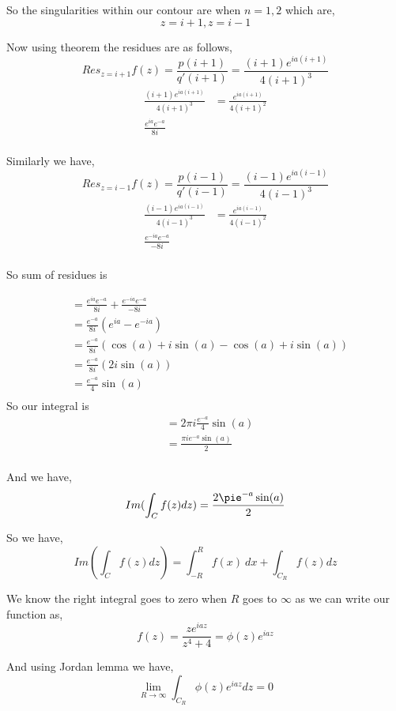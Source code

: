 \documentclass[a4paper]{report}
\begin{document}
So the singularities within our contour are when $n = 1, 2$ which are, 
$$ z = i + 1, z = i - 1 $$  



Now using theorem the residues are as follows, 
$$ Res_{z = i + 1} f(z) = \frac{p(i + 1)}{q'(i + 1)}  = \frac{(i + 1)e^{ia(i + 1)}}{4(i + 1)^{3}}$$ 
\begin{align*}
    \frac{(i + 1)e^{ia(i + 1)}}{4(i + 1)^{3}} &=\frac{ e^{ia(i + 1)}}{4(i + 1)^2}\\
\frac{ e^{ia }e^{- a}}{8i}\\
\end{align*}

Similarly we have, 
$$ Res_{z = i - 1} f(z) = \frac{p(i - 1)}{q'(i - 1)}  = \frac{(i - 1)e^{ia(i - 1)}}{4(i - 1)^{3}}$$ 
\begin{align*}
    \frac{(i - 1)e^{ia(i - 1)}}{4(i - 1)^{3}} &=\frac{ e^{ia(i - 1)}}{4(i - 1)^2}\\
\frac{ e^{-ia }e^{- a}}{-8i}\\
\end{align*}

So sum of residues is 

\begin{align*}
&= \frac{ e^{ia }e^{- a}}{8i} + \frac{ e^{-ia }e^{- a}}{-8i}\\
&= \frac{e^{-a}}{8i} (e^{ia} - e^{-ia})\\
&= \frac{e^{-a}}{8i}  (\cos(a) + i \sin(a) - \cos(a)+ i \sin(a))\\
&= \frac{e^{-a}}{8i}  (2 i \sin(a) )\\
&= \frac{e^{-a}}{4}   \sin(a) \\
\end{align*}
So our integral is
\begin{align*}
    &= 2\pi i\frac{e^{-a}}{4}   \sin(a)\\
    &= \frac{\pi i e^{-a} \sin(a)}{2}\\
\end{align*}

And we have, 
$$ Im (\int_C f(z) dz ) = \frac{2\pie^{-a}\sin(a)}{2} $$ 



So we have, 
$$  Im (\int_C f(z) dz )  = \int_{{-R}}^{{R}} {f(x)} \: d{x}  + \int_{C_R}f(z) dz$$ 

We know the right integral goes to zero when $R$ goes to $\infty$ as we can write our function as, 
$$ f(z) = \frac{ze^{iaz}}{z^{4} + 4} = \phi(z)e^{iaz} $$ 

And using Jordan lemma we have, 
$$ \lim_{R \rightarrow \infty }\int_{C_R} \phi(z) e^{iaz} dz  = 0$$ 
\end{document}
